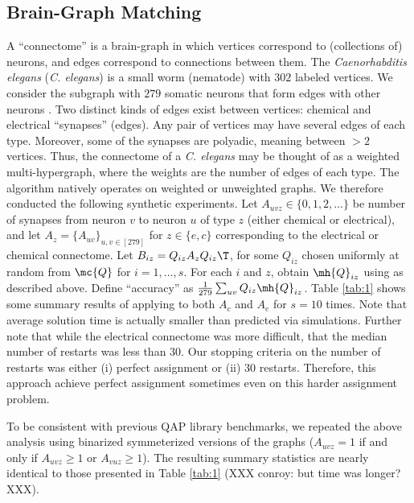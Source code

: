 \documentclass[10pt,journal,cspaper,compsoc]{IEEEtran}
\begin{document}


\subsection{Brain-Graph Matching} %
\label{sub:connectome_classification}

A ``connectome'' is a brain-graph in which vertices correspond to (collections of) neurons, and edges correspond to connections between them. The \emph{Caenorhabditis elegans} (\emph{C. elegans}) is a small worm (nematode) with $302$ labeled vertices.  We consider the subgraph with $279$ somatic neurons that form edges with other neurons \cite{WhiteBrenner86, Varshney2009}.  Two distinct kinds of edges exist between vertices: chemical and electrical ``synapses'' (edges). Any pair of vertices may have several edges of each type. Moreover, some of the synapses are polyadic, meaning between $>2$ vertices.    Thus, the connectome of a \emph{C. elegans} may be thought of as a weighted multi-hypergraph, where the weights are the number of edges of each type.  The \qapm algorithm natively operates on weighted or unweighted graphs.  We therefore conducted the following synthetic experiments.  Let $A_{uvz} \in \{0,1,2,\ldots\}$ be number of synapses from neuron $v$ to neuron $u$ of type $z$ (either chemical or electrical), and let $A_z=\{A_{uv}\}_{u,v \in [279]}$ for $z \in \{e,c\}$ corresponding to the electrical or chemical connectome.  Let $B_{iz}=Q_{iz} A_z Q_{iz}\T$, for some $Q_{iz}$ chosen uniformly at random from $\mc{Q}$ for $i=1,\ldots,s$.  For each $i$ and $z$, obtain $\mh{Q}_{iz}$ using \qapm as described above.  Define ``accuracy'' as $\frac{1}{279}\sum_{uv} Q_{iz} \mh{Q}_{iz}$.  Table \ref{tab:1} shows some summary results of applying \qapm to both $A_c$ and $A_e$ for $s=10$ times.  Note that average solution time is actually smaller than predicted via simulations.  Further note that while the electrical connectome was more difficult, that the median number of restarts was less than $30$.  Our stopping criteria on the number of restarts was either (i) perfect assignment or (ii) 30 restarts.  Therefore, this approach achieve perfect assignment sometimes even on this harder assignment problem.

To be consistent with previous QAP library benchmarks, we repeated the above analysis using binarized symmeterized versions of the graphs ($A_{uvz}=1$ if and only if $A_{uvz}\geq 1$ or $A_{vuz} \geq 1$).  The resulting summary statistics are nearly identical to those presented in Table \ref{tab:1} (XXX conroy: but time was longer? XXX).
\end{document}
